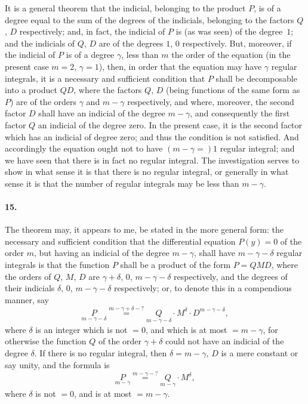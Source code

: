 \documentclass[11pt,a4paper]{book}
\begin{document}
It is a general theorem that the indicial, belonging to the product $P$, is of a degree equal to the sum of the degrees of the indicials, belonging to the factors $Q$, $D$ respectively; and, in fact, the indicial of $P$ is (as was seen) of the degree~$1$; and the indicials of $Q$, $D$ are of the degrees $1$, $0$ respectively. But, moreover, if the indicial of $P$ is of a degree $\gamma$, less than $m$ the order of the equation (in the present case $m=2$, $\gamma=1$), then, in order that the equation may have $\gamma$ regular integrals, it is a necessary and sufficient condition that $P$ shall be decomposable into a product $QD$, where the factors $Q$, $D$ (being functions of the same form as $P$) are of the orders $\gamma$ and $m-\gamma$ respectively, and where, moreover, the second factor $D$ shall have an indicial of the degree $m-\gamma$, and consequently the first factor $Q$ an indicial of the degree zero. In the present case, it is the second factor which has an indicial of degree zero; and thus the condition is not satisfied. And accordingly the equation ought not to have $(m-\gamma=)1$ regular integral; and we have seen that there is in fact no regular integral. The investigation serves to show in what sense it is that there is no regular integral, or generally in what sense it is that the number of regular integrals may be less than $m-\gamma$.

\paragraph{15.} The theorem may, it appears to me, be stated in the more general form: the necessary and sufficient condition that the differential equation $P(y) = 0$ of the order $m$, but having an indicial of the degree $m-\gamma$, shall have $m-\gamma-\delta$ regular integrals is that the function $P$ shall be a product of the form $P = QMD$, where the orders of $Q$, $M$, $D$ are $\gamma+\delta$, $0$, $m-\gamma-\delta$ respectively, and the degrees of their indicials $\delta$, $0$, $m-\gamma-\delta$ respectively; or, to denote this in a compendious manner, say
\[
\underset{m-\gamma-\delta}{P} \overset{m-\gamma+\delta-?}{=} \underset{m-\gamma-\delta}{Q} \cdot M^{\delta} \cdot D^{m-\gamma-\delta},
\]
where $\delta$ is an integer which is not $=0$, and which is at most $=m-\gamma$, for otherwise the function $Q$ of the order $\gamma+\delta$ could not have an indicial of the degree $\delta$. If there is no regular integral, then $\delta = m-\gamma$, $D$ is a mere constant or say unity, and the formula is
\[
\underset{m-\gamma}{P} \overset{m-\gamma-?}{=} \underset{m-\gamma}{Q} \cdot M^{\delta},
\]
where $\delta$ is not $=0$, and is at most $=m-\gamma$.
\end{document}
